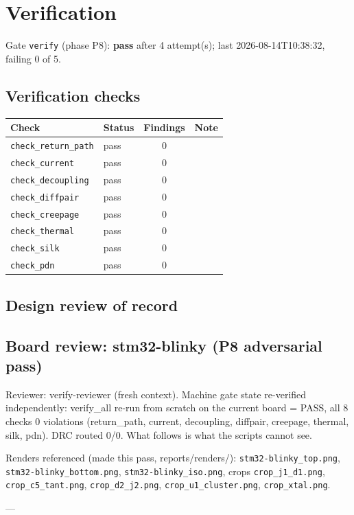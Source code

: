 \documentclass[11pt,a4paper]{article}
\begin{document}
\section{Verification}
Gate \texttt{verify} (phase P8): \textbf{pass} after 4 attempt(s); last 2026-08-14T10:38:32, failing 0 of 5.
\subsection*{Verification checks}
{\small
\begin{longtable}{llcp{6cm}}
\toprule
\textbf{Check} & \textbf{Status} & \textbf{Findings} & \textbf{Note} \\
\midrule
\endhead
\texttt{check\_return\_path} & pass & 0 &  \\
\texttt{check\_current} & pass & 0 &  \\
\texttt{check\_decoupling} & pass & 0 &  \\
\texttt{check\_diffpair} & pass & 0 &  \\
\texttt{check\_creepage} & pass & 0 &  \\
\texttt{check\_thermal} & pass & 0 &  \\
\texttt{check\_silk} & pass & 0 &  \\
\texttt{check\_pdn} & pass & 0 &  \\
\bottomrule
\end{longtable}
}
\subsection*{Design review of record}
\subsection*{Board review: stm32-blinky (P8 adversarial pass)}
Reviewer: verify-reviewer (fresh context). Machine gate state re-verified independently: verify\_all re-run from scratch on the current board = PASS, all 8 checks 0 violations (return\_path, current, decoupling, diffpair, creepage, thermal, silk, pdn). DRC routed 0/0. What follows is what the scripts cannot see.

Renders referenced (made this pass, reports/renders/): \texttt{stm32-blinky\_top.png}, \texttt{stm32-blinky\_bottom.png}, \texttt{stm32-blinky\_iso.png}, crops \texttt{crop\_j1\_d1.png}, \texttt{crop\_c5\_tant.png}, \texttt{crop\_d2\_j2.png}, \texttt{crop\_u1\_cluster.png}, \texttt{crop\_xtal.png}.

---
\end{document}
